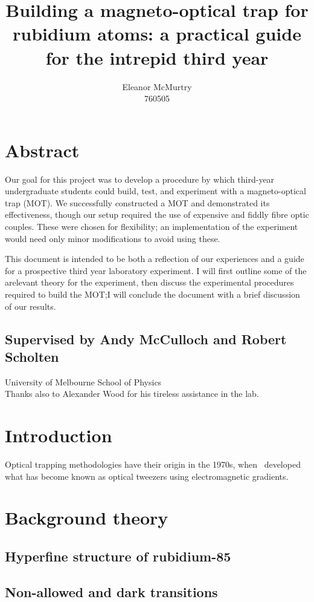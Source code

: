 \documentclass[11pt,twoside,a4paper]{article}
\author{Eleanor McMurtry\\760505}
\title{Building a magneto-optical trap for rubidium atoms: a practical guide for the intrepid third year}
\begin{document}
\maketitle
\section*{Abstract}
Our goal for this project was to develop a procedure by which third-year undergraduate students could
build, test, and experiment with a magneto-optical trap (MOT). We successfully constructed a MOT and
demonstrated its effectiveness, though our setup required the use of expensive and fiddly fibre optic couples.
These were chosen for flexibility; an implementation of the experiment would need only minor modifications
to avoid using these.

This document is intended to be both a reflection of our experiences and a guide for a prospective
third year laboratory experiment. I will first outline some of the arelevant theory for the experiment,
then discuss the experimental procedures required to build the MOT;\@ I will conclude the document with a brief
discussion of our results.

\begin{center}    
\subsection*{Supervised by Andy McCulloch and Robert Scholten}
University of Melbourne School of Physics\\
Thanks also to Alexander Wood for his tireless assistance in the lab.
\end{center}
\pagebreak
\tableofcontents
\vfill
\pagebreak
\section{Introduction}
Optical trapping methodologies have their origin in the 1970s, when~\cite{ashkin} developed what has become known
as optical tweezers using electromagnetic gradients.
\section{Background theory}
\subsection{Hyperfine structure of rubidium-85}
\subsection{Non-allowed and dark transitions}
\end{document}
